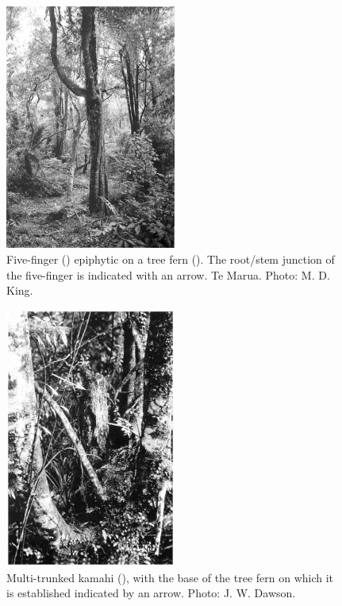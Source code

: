 \begin{figure}
	\includegraphics[width=0.5\textwidth]{graphics/figure55fivefinger.jpg}
	\centering
	\caption[Five-finger epiphytic on a tree fern]{Five-finger () epiphytic on a tree fern (). The root/stem junction of the five-finger is indicated with an arrow. Te Marua. Photo:  M. D. King.}
	\label{fig:55fivefinger}
\end{figure}

\begin{figure}
	\includegraphics[width=0.5\textwidth]{graphics/figure56kamahi.jpg}
	\centering
	\caption[Multi-trunked kamahi]{Multi-trunked kamahi (), with the base of the tree fern on which it is established indicated by an arrow.
	Photo: J. W. Dawson.}
	\label{fig:56kamahi}
\end{figure}

